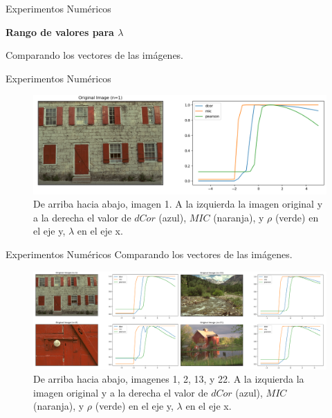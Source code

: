 \documentclass{beamer}
\begin{document}
\begin{frame}{Experimentos Numéricos}
    \begin{center}
        {\Large\bf Rango de valores para $\lambda$}
    \end{center}
    \pause

    \begin{center}
        {\Large  Comparando los vectores de las imágenes.}
    \end{center}
\end{frame}


\begin{frame}{Experimentos Numéricos}
    
    \begin{figure}[H]
        \centering
        \includegraphics[width=\textwidth]{lam_v_com_one.png}
        \caption{De arriba hacia abajo, imagen 1. A la izquierda la imagen original y a la derecha el valor de $dCor$ (azul), $MIC$ (naranja), y $\rho$ (verde) en el eje y, $\lambda$ en el eje x.}
    \end{figure}
\end{frame}

\begin{frame}{Experimentos Numéricos}
    Comparando los vectores de las imágenes.
    \begin{figure}[H]
        \centering
        \includegraphics[width=\textwidth]{lam_v_com_all_img.png}
        \caption{De arriba hacia abajo, imagenes 1, 2, 13, y 22. A la izquierda la imagen original y a la derecha el valor de $dCor$ (azul), $MIC$ (naranja), y $\rho$ (verde) en el eje y, $\lambda$ en el eje x.}
    \end{figure}
\end{frame}
\end{document}
